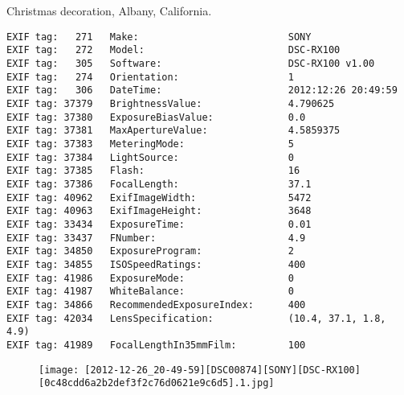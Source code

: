 \section{\protect{}}
\noindent Christmas decoration, Albany, California.
\noindent
\begin{lstlisting}
EXIF tag:   271   Make:                          SONY
EXIF tag:   272   Model:                         DSC-RX100
EXIF tag:   305   Software:                      DSC-RX100 v1.00
EXIF tag:   274   Orientation:                   1
EXIF tag:   306   DateTime:                      2012:12:26 20:49:59
EXIF tag: 37379   BrightnessValue:               4.790625
EXIF tag: 37380   ExposureBiasValue:             0.0
EXIF tag: 37381   MaxApertureValue:              4.5859375
EXIF tag: 37383   MeteringMode:                  5
EXIF tag: 37384   LightSource:                   0
EXIF tag: 37385   Flash:                         16
EXIF tag: 37386   FocalLength:                   37.1
EXIF tag: 40962   ExifImageWidth:                5472
EXIF tag: 40963   ExifImageHeight:               3648
EXIF tag: 33434   ExposureTime:                  0.01
EXIF tag: 33437   FNumber:                       4.9
EXIF tag: 34850   ExposureProgram:               2
EXIF tag: 34855   ISOSpeedRatings:               400
EXIF tag: 41986   ExposureMode:                  0
EXIF tag: 41987   WhiteBalance:                  0
EXIF tag: 34866   RecommendedExposureIndex:      400
EXIF tag: 42034   LensSpecification:             (10.4, 37.1, 1.8, 4.9)
EXIF tag: 41989   FocalLengthIn35mmFilm:         100

\end{lstlisting}
\clearpage
\begin{figure}
\raggedleft
\texttt{[image: [2012-12-26\_20-49-59][DSC00874][SONY][DSC-RX100][0c48cdd6a2b2def3f2c76d0621e9c6d5].1.jpg]}
\end{figure}


\clearpage
